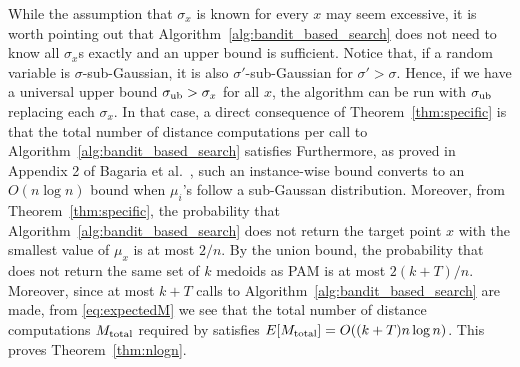 







While the assumption that $\sigma_x$ is known for every $x$ may seem excessive, it is worth pointing out that Algorithm~\ref{alg:bandit_based_search} does not need to know all $\sigma_x$s exactly and an upper bound is sufficient.
Notice that, if a random variable is $\sigma$-sub-Gaussian, it is also $\sigma'$-sub-Gaussian for $\sigma' > \sigma$.
Hence, if we have a universal upper bound $\sigma_{\rm ub}> \sigma_x$ for all $x$, the algorithm can be run with $\sigma_{\rm ub}$ replacing each $\sigma_x$.
In that case, a direct consequence of Theorem~\ref{thm:specific} is that the total number of distance computations per call to Algorithm~\ref{alg:bandit_based_search} satisfies
Furthermore, as proved in Appendix 2 of Bagaria et al.~\cite{bagaria2018medoids}, such an instance-wise bound converts to an $O(n \log n)$ bound when $\mu_i$'s follow a sub-Gaussan distribution.
Moreover, from Theorem~\ref{thm:specific}, the probability that Algorithm~\ref{alg:bandit_based_search} does not return the target point $x$ with the smallest value of $\mu_x$ is at most $2/n$.
By the union bound, the probability that \algname does not return the same set of $k$ medoids as PAM is at most $2(k+T)/n$.
Moreover, since at most $k+T$ calls to Algorithm~\ref{alg:bandit_based_search} are made, from \eqref{eq:expectedM} we see that the total number of distance computations $M_{\rm total}$ required by \algname satisfies $E[M_{\rm total}] = O((k+T) n \log n)$.
This proves Theorem~\ref{thm:nlogn}.



